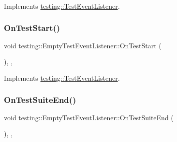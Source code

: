 Implements \mbox{\hyperlink{classtesting_1_1_test_event_listener_ab4f6a0ca16ae75daf385b3b5914e1048}{testing\+::\+Test\+Event\+Listener}}.

\mbox{\label{classtesting_1_1_empty_test_event_listener_a1d8c7f3f1f92826f668edae1bc5aadf4}} 
\subsubsection{\texorpdfstring{OnTestStart()}{OnTestStart()}\hspace{0.1cm}{\footnotesize\ttfamily [3/3]}}
{\footnotesize\ttfamily void testing\+::\+Empty\+Test\+Event\+Listener\+::\+On\+Test\+Start (\begin{DoxyParamCaption}\item[{const \mbox{\hyperlink{classtesting_1_1_test_info}{Test\+Info}} \&}]{ }\end{DoxyParamCaption})\hspace{0.3cm}{\ttfamily [inline]}, {\ttfamily [override]}, {\ttfamily [virtual]}}



Implements \mbox{\hyperlink{classtesting_1_1_test_event_listener_ab4f6a0ca16ae75daf385b3b5914e1048}{testing\+::\+Test\+Event\+Listener}}.

\mbox{\label{classtesting_1_1_empty_test_event_listener_aefdb73682d290791461e186d864db718}} 
\subsubsection{\texorpdfstring{OnTestSuiteEnd()}{OnTestSuiteEnd()}\hspace{0.1cm}{\footnotesize\ttfamily [1/2]}}
{\footnotesize\ttfamily void testing\+::\+Empty\+Test\+Event\+Listener\+::\+On\+Test\+Suite\+End (\begin{DoxyParamCaption}\item[{const \mbox{\hyperlink{classtesting_1_1_test_suite}{Test\+Suite}} \&}]{ }\end{DoxyParamCaption})\hspace{0.3cm}{\ttfamily [inline]}, {\ttfamily [override]}, {\ttfamily [virtual]}}




